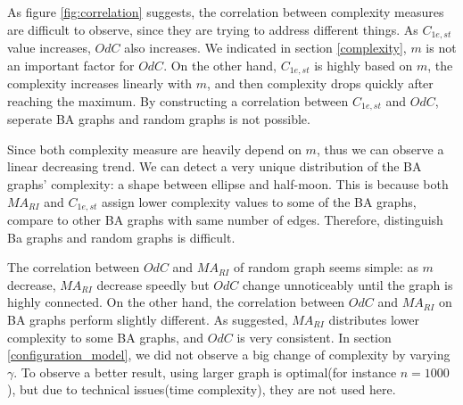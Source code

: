 \documentclass[12pt]{article}
\begin{document}
\noindent
As figure \ref{fig:correlation} suggests, the correlation between complexity measures are difficult to observe, since they are trying to address different things. As $C_{1e,st}$ value increases, $OdC$ also increases. We indicated in section \ref{complexity}, $m$ is not an important factor for $OdC$. On the other hand, $C_{1e,st}$ is highly based on $m$, the complexity increases linearly with $m$, and then complexity drops quickly after reaching the maximum. By constructing a correlation between $C_{1e,st}$ and $OdC$, seperate BA graphs and random graphs is not possible.\par
Since both complexity measure are heavily depend on $m$, thus we can observe a linear decreasing trend. We can detect a very unique distribution of the BA graphs' complexity: a shape between ellipse and half-moon. This is because both $MA_{RI}$ and $C_{1e,st}$ assign lower complexity values to some of the BA graphs, compare to other BA graphs with same number of edges. Therefore, distinguish Ba graphs and random graphs is difficult.\par
The correlation between $OdC$ and $MA_{RI}$ of random graph seems simple: as $m$ decrease, $MA_{RI}$ decrease speedly but $OdC$ change unnoticeably until the graph is highly connected. On the other hand, the correlation between $OdC$ and $MA_{RI}$ on BA graphs perform slightly different. As suggested, $MA_{RI}$ distributes lower complexity to some BA graphs, and $OdC$ is very consistent. In section \ref{configuration_model}, we did not observe a big change of complexity by varying $\gamma$. To observe a better result, using larger graph is optimal(for instance $n=1000$), but due to technical issues(time complexity), they are not used here.
\end{document}
